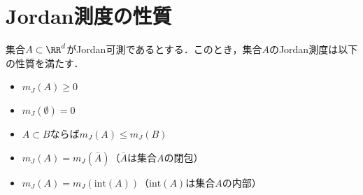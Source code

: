 \section{Jordan測度の性質}
\begin{theorem}[Jordan測度の性質]
    集合$A \subset \RR^d$がJordan可測であるとする．このとき，集合$A$のJordan測度は以下の性質を満たす．
    \begin{itemize}
        \item $m_J(A) \ge 0$
        \item $m_J(\emptyset) = 0$
        \item $A \subset B$ならば$m_J(A) \le m_J(B)$
        \item $m_J(A) = m_J(\overline{A})$（$\overline{A}$は集合$A$の閉包）
        \item $m_J(A) = m_J(\mathrm{int}(A))$（$\mathrm{int}(A)$は集合$A$の内部）
    \end{itemize}
\end{theorem}
